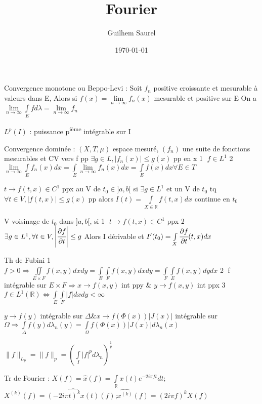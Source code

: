 \documentclass[10pt,a4paper]{article}
\title{Fourier}
\date{\today}
\author{Guilhem Saurel}
\begin{document}
\maketitle
\begin{multicols}{2}

Convergence monotone ou Beppo-Levi : Soit $f_n$ positive croissante et mesurable à valeurs dans E, Alors si $f(x)=\lim \limits_{n\to\infty} f_n(x)$ mesurable et positive sur E On a $\lim \limits_{n\to\infty} \int\limits_E f d\lambda = \lim\limits_{n\to\infty}f_n$

$L^p(I)$ : puissance p\textsuperscript{ième} intégrable sur I

Convergence dominée : $(X,T,\mu)$ espace mesuré, $(f_n)$ une suite de fonctions mesurables et CV vers f pp $\exists g \in L, |f_n(x)| \leq g(x)$ pp en x \textcircled{1} $f\in L^1$ \textcircled{2} $\lim \limits_{n\to\infty} \int \limits_E f_n (x)dx = \int \limits_E \lim \limits_{n\to\infty} f_n(x)dx = \int \limits_E f(x)dx \forall E \in T$

$t \rightarrow f(t,x) \in C^1$ ppx au V de $t_0 \in ]a,b[$ si $\exists g\in L^1$ et un V de $t_0$ tq $\forall t \in V, |f(t,x)| \leq g(x)$ pp alors $I(t) = \int \limits_{X \in \mathbb{R}} f(t,x) dx$ continue en $t_0$

V voisinage de $t_0$ dans $]a,b[$, si \textcircled{1} $t \rightarrow f(t,x) \in C^1$ ppx \textcircled{2} $\exists g \in L^1, \forall t \in V, \left|\cfrac{\partial f}{\partial t} \right| \leq g$ Alors I dérivable et $I^\prime(t_0) = \int \limits_X \cfrac{\partial f}{\partial t} (t,x) dx$

Th de Fubini \textcircled{1} $f > 0 \Rightarrow \iint \limits_{E\times F} f(x,y)dxdy = \int\limits_E\int\limits_Ff(x,y)dxdy=\int\limits_F\int\limits_Ef(x,y)dydx$ \textcircled{2} f intégrable sur $E\times F \Rightarrow x\rightarrow f(x,y)$ int ppy \& $y \rightarrow f(x,y)$ int ppx \textcircled{3} $f\in L^1(\mathbb{R}) \Leftrightarrow \int\limits_E\int\limits_F|f|dxdy < \infty$

$y\rightarrow f(y)$ intégrable sur $\Delta$\&$x\rightarrow f(\Phi(x))|J(x)|$ intégrable sur $\Omega \Rightarrow \int\limits_\Delta f(y)d\lambda_n(y)=\int\limits_\Omega f(\Phi(x))|J(x)|d\lambda_n(x)$

$\|f\|_{L_p}=\|f\|_p = \left(\int\limits_I|f|^pd\lambda_n\right)^{\frac{1}{p}}$

Tr de Fourier : $X(f) = \widehat{x}(f) = \int \limits_\mathbb{R} x(t) e^{-2i\pi ft} dt$;$X^{(k)}(f) = \widehat{(-2i\pi t)^k x(t)}(f)$;$\widehat{x^{(k)}}(f) = (2i\pi f)^k X(f)$


\end{multicols}
\end{document}
